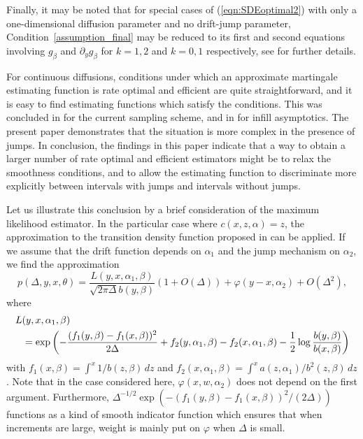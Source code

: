 \documentclass[11pt,a4paper]{article}
\numberwithin{equation}{section}
\numberwithin{theorem}{section}
\begin{document}
Finally, it may be noted that for special cases of (\ref{eqn:SDEoptimal2}) with only a one-dimensional diffusion parameter and no drift-jump parameter, Condition~\ref{assumption_final} may be reduced to its first and second equations involving $g_\beta$ and $\partial_y g_\beta$ for $k=1,2$ and $k=0,1$ respectively, see \cite[Section 3.4.4]{phdthesis} for further details. \medskip

For continuous diffusions, conditions under which an approximate martingale estimating function is rate optimal and efficient are quite straightforward, and it is easy to find estimating functions which satisfy the conditions. This was concluded in \cite{efficient} for the current sampling scheme, and in \cite{jakobsen2017} for infill asymptotics. The present paper demonstrates that the situation is more complex in the presence of jumps. In conclusion, the findings in this paper indicate that a way to obtain a larger number of rate optimal and efficient estimators might be to relax the smoothness conditions, and to allow the estimating function to discriminate more explicitly between intervals with jumps and intervals without jumps.  \medskip

Let us illustrate this conclusion by a brief consideration of the maximum likelihood estimator. In the particular case where $c(x,z,\alpha) = z$, the approximation to the transition density function proposed in \cite{yu2007} can be applied. If we assume that the drift function depends on $\alpha_1$ and the jump mechanism on $\alpha_2$, we find the approximation
\[
p(\Delta,y,x,\theta) = \frac{L(y,x,\alpha_1,\beta)}{\sqrt{2\pi\Delta} b(y,\beta)}(1 + O(\Delta))  +\varphi(y-x,\alpha_2) + O(\Delta^2),
\]
where
\begin{eqnarray*}
\lefteqn{L(y,x,\alpha_1,\beta)} \\ && = \exp \left(-\frac{(f_1(y,\beta)-f_1(x,\beta))^2}{2\Delta} +  f_2(y,\alpha_1,\beta) - f_2(x,\alpha_1,\beta) -\frac12 \log \frac{b(y,\beta)}{b(x,\beta)} \right)
\end{eqnarray*}
with $f_1(x,\beta) = \int^x 1/b (z,\beta) \,dz$ and $f_2(x, \alpha_1,\beta) 
= \int^x a(z,\alpha_1)/b^2(z,\beta) \,dz$. Note that in the case considered here, $\varphi(x,w,\alpha_2)$ does not depend on the first argument. Furthermore, $\Delta^{-1/2} \exp (-(f_1(y,\beta)-f_1(x,\beta))^2/(2\Delta) )$ functions as a kind of smooth indicator function which ensures that when increments are large, weight is mainly put on $\varphi$ when $\Delta$ is small.
\medskip
 
\end{document}

